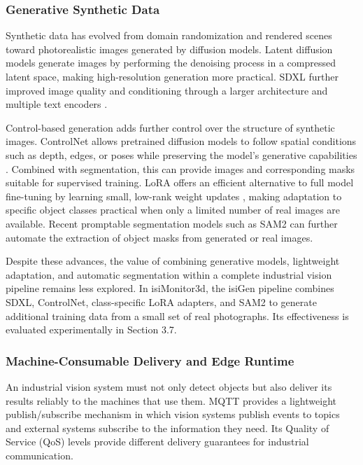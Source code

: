 \documentclass[9pt,a4paper,twocolumn]{rho-class/rho}
\begin{document}
\subsubsection{Generative Synthetic Data}

Synthetic data has evolved from domain randomization and rendered scenes toward photorealistic images generated by diffusion models. Latent diffusion models generate images by performing the denoising process in a compressed latent space, making high-resolution generation more practical. SDXL further improved image quality and conditioning through a larger architecture and multiple text encoders \cite{podell2023sdxl}.

Control-based generation adds further control over the structure of synthetic images. ControlNet allows pretrained diffusion models to follow spatial conditions such as depth, edges, or poses while preserving the model's generative capabilities \cite{zhang2023controlnet}. Combined with segmentation, this can provide images and corresponding masks suitable for supervised training. LoRA offers an efficient alternative to full model fine-tuning by learning small, low-rank weight updates \cite{hu2022lora}, making adaptation to specific object classes practical when only a limited number of real images are available. Recent promptable segmentation models such as SAM2 \cite{ravi2024sam2} can further automate the extraction of object masks from generated or real images.

Despite these advances, the value of combining generative models, lightweight adaptation, and automatic segmentation within a complete industrial vision pipeline remains less explored. In isiMonitor3d, the isiGen pipeline combines SDXL, ControlNet, class-specific LoRA adapters, and SAM2 to generate additional training data from a small set of real photographs. Its effectiveness is evaluated experimentally in Section 3.7.

\subsubsection{Machine-Consumable Delivery and Edge Runtime}

An industrial vision system must not only detect objects but also deliver its results reliably to the machines that use them. MQTT provides a lightweight publish/subscribe mechanism in which vision systems publish events to topics and external systems subscribe to the information they need. Its Quality of Service (QoS) levels provide different delivery guarantees for industrial communication.
\end{document}

